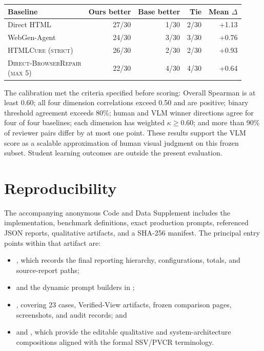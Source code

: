 \documentclass[letterpaper]{article}
\newcommand{\ssv}{\textsc{SSV}}
\newcommand{\pvcr}{\textsc{PVCR}}
\newcommand{\htmlcure}{\textsc{HTMLCure (strict)}}
\newenvironment{coltable}
  {\begin{center}\begin{minipage}{\columnwidth}\centering}
  {\end{minipage}\end{center}}
\begin{document}
\begin{coltable}
\scriptsize
\setlength{\tabcolsep}{2pt}
\begin{tabular}{@{}lrrrr@{}}
\toprule
Baseline & Ours better & Base better & Tie & Mean $\Delta$ \\
\midrule
Direct HTML & 27/30 & 1/30 & 2/30 & +1.13 \\
WebGen-Agent & 24/30 & 3/30 & 3/30 & +0.76 \\
\htmlcure{} & 26/30 & 2/30 & 2/30 & +0.93 \\
\shortstack[l]{\textsc{Direct-BrowserRepair}\\\textsc{(max 5)}} & 22/30 & 4/30 & 4/30 & +0.64 \\
\bottomrule
\end{tabular}
\label{tab:human-paired-preference}
\end{coltable}

The calibration met the criteria specified before scoring: Overall Spearman is at least 0.60; all four dimension correlations exceed 0.50 and are positive; binary threshold agreement exceeds 80\%; human and VLM winner directions agree for four of four baselines; each dimension has weighted $\kappa\geq0.60$; and more than 90\% of reviewer pairs differ by at most one point. These results support the VLM score as a scalable approximation of human visual judgment on this frozen subset. Student learning outcomes are outside the present evaluation.

\section{Reproducibility}

{\raggedright
The accompanying anonymous Code and Data Supplement includes the implementation, benchmark definitions, exact production prompts, referenced JSON reports, qualitative artifacts, and a SHA-256 manifest. The principal entry points within that artifact are:
\begin{itemize}
  \item {}, which records the final reporting hierarchy, configurations, totals, and source-report paths;
  \item {} and the dynamic prompt builders in ;
  \item {}, covering 23 cases, Verified-View artifacts, frozen comparison pages, screenshots, and audit records; and
  \item {} and , which provide the editable qualitative and system-architecture compositions aligned with the formal \ssv{}/\pvcr{} terminology.
\end{itemize}
\par}
\end{document}

